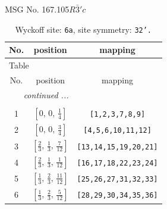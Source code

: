 \documentclass[fleqn,8pt]{jsarticle}
\begin{document}
\setcounter{MaxMatrixCols}{32}

\renewcommand{\tablename}{Table~}
\renewcommand{\figurename}{Figure~}
\begin{center}
\LARGE
MSG No. 167.105\quad$R\bar{3}'c$
\end{center}
\renewcommand{\arraystretch}{1.2}
\begin{longtable}{ccc}
\caption{Wyckoff site: {\tt 6a}, site symmetry: {\tt 32'.}}
 \\
 \hline \hline
No. & position & mapping \\ \hline \endfirsthead

\multicolumn{2}{l}{\tablename\ \thetable{}} \\
 \hline \hline
No. & position & mapping \\ \hline \endhead

 \hline \hline
\multicolumn{2}{r}{\footnotesize\it continued ...} \\ \endfoot

 \hline \hline
\multicolumn{2}{r}{} \\ \endlastfoot

1 & $\left[ 0,\, 0,\, \frac{1}{4} \right]$ & {\tt [1,2,3,7,8,9]} \\ \hline
2 & $\left[ 0,\, 0,\, \frac{3}{4} \right]$ & {\tt [4,5,6,10,11,12]} \\ \hline
3 & $\left[ \frac{2}{3},\, \frac{1}{3},\, \frac{7}{12} \right]$ & {\tt [13,14,15,19,20,21]} \\ \hline
4 & $\left[ \frac{2}{3},\, \frac{1}{3},\, \frac{1}{12} \right]$ & {\tt [16,17,18,22,23,24]} \\ \hline
5 & $\left[ \frac{1}{3},\, \frac{2}{3},\, \frac{11}{12} \right]$ & {\tt [25,26,27,31,32,33]} \\ \hline
6 & $\left[ \frac{1}{3},\, \frac{2}{3},\, \frac{5}{12} \right]$ & {\tt [28,29,30,34,35,36]} \\
\end{longtable}
\renewcommand{\arraystretch}{1.2}
\end{document}
